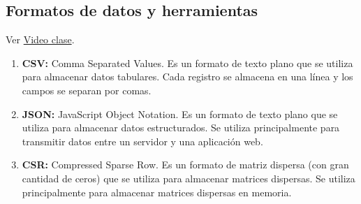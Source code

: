 \documentclass[../main.tex]{subfiles}
\begin{document}
    \subsection{Formatos de datos y herramientas}
        Ver \href{https://www.youtube.com/watch?v=IIRKrslUO_I&list=PLeo_qKwGPZYevnuxYBfrvQ32zJJE2--Y4&index=6}{Video clase}.
        \begin{enumerate}
            \item \textbf{CSV:} Comma Separated Values. Es un formato de texto plano que se utiliza para almacenar datos tabulares. Cada registro se almacena en una línea y los campos se separan por comas.
            \item \textbf{JSON:} JavaScript Object Notation. Es un formato de texto plano que se utiliza para almacenar datos estructurados. Se utiliza principalmente para transmitir datos entre un servidor y una aplicación web.
            \item \textbf{CSR:} Compressed Sparse Row. Es un formato de matriz dispersa (con gran cantidad de ceros) que se utiliza para almacenar matrices dispersas. Se utiliza principalmente para almacenar matrices dispersas en memoria.
        \end{enumerate}
\end{document}

